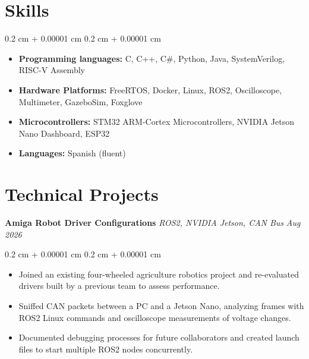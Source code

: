 \documentclass[10pt, letterpaper]{article}
\newenvironment{highlights}{
    \begin{itemize}[
        topsep=0.10 cm,
        parsep=0.10 cm,
        partopsep=0pt,
        itemsep=0pt,
        leftmargin=0.4 cm + 10pt
    ]
}{
    \end{itemize}
} %
\newenvironment{onecolentry}{
    \begin{adjustwidth}{
        0.2 cm + 0.00001 cm
    }{
        0.2 cm + 0.00001 cm
    }
}{
    \end{adjustwidth}
} %
\begin{document}
\section{Skills}

\begin{onecolentry}
\begin{highlights}
    \item \textbf{Programming languages:} C, C++, C\#, Python, Java, SystemVerilog, RISC-V Assembly
    \item \textbf{Hardware Platforms:} FreeRTOS, Docker, Linux, ROS2, Oscilloscope, Multimeter, GazeboSim, Foxglove
    \item \textbf{Microcontrollers:} STM32 ARM-Cortex Microcontrollers, NVIDIA Jetson Nano Dashboard, ESP32
    \item \textbf{Languages:} Spanish (fluent)
\end{highlights}
\end{onecolentry}
   
\section{Technical Projects}

\textbf{Amiga Robot Driver Configurations} \textbar{} \textit{ROS2, NVIDIA Jetson, CAN Bus} \hfill \textit{Aug 2026}
\vspace{0.08 cm}
\begin{onecolentry}
\begin{highlights}
    \item Joined an existing four-wheeled agriculture robotics project and re-evaluated drivers built by a previous team to assess performance.
    \item Sniffed CAN packets between a PC and a Jetson Nano, analyzing frames with ROS2 Linux commands and oscilloscope measurements of voltage changes.
    \item Documented debugging processes for future collaborators and created launch files to start multiple ROS2 nodes concurrently.
\end{highlights}
\end{onecolentry}
\vspace{0.14 cm}
\end{document}
